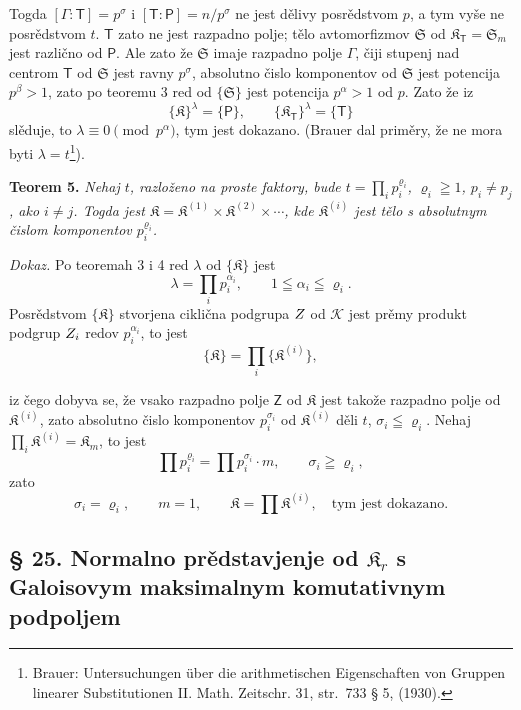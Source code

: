 \documentclass[11pt]{article}
\newcommand{\srcfn}[2]{\footnote{#2}}
\newcommand{\foreign}[1]{#1}
\begin{document}
Togda \([\Gamma:\mathsf{T}]=p^\sigma\) i \([\mathsf{T}:\mathsf P]=n/p^\sigma\) ne jest dělivy posrědstvom \(p\), a tym vyše ne posrědstvom \(t\). \(\mathsf{T}\) zato ne jest razpadno polje; tělo avtomorfizmov \(\mathfrak S\) od \(\mathfrak K_{\mathsf{T}}=\mathfrak S_m\) jest različno od \(\mathsf P\). Ale zato že \(\mathfrak S\) imaje razpadno polje \(\Gamma\), čiji stupenj nad centrom \(\mathsf{T}\) od \(\mathfrak S\) jest ravny \(p^\sigma\), absolutno čislo komponentov od \(\mathfrak S\) jest potencija \(p^\beta>1\), zato po teoremu 3 red od \(\{\mathfrak S\}\) jest potencija \(p^\alpha>1\) od \(p\). Zato že iz
\[
\{\mathfrak K\}^{\lambda}=\{\mathsf P\},
\qquad
\{\mathfrak K_{\mathsf{T}}\}^{\lambda}=\{\mathsf{T}\}
\]
slěduje, to \(\lambda\equiv0\pmod {p^\alpha}\), tym jest dokazano. (Brauer dal priměry, že ne mora byti \(\lambda=t\)\srcfn{1}{\foreign{Brauer: Untersuchungen über die arithmetischen Eigenschaften von Gruppen linearer Substitutionen II. Math. Zeitschr. 31, str.~733 § 5, (1930).}}).

\textbf{Teorem 5.} \emph{Nehaj \(t\), razloženo na proste faktory, bude \(t=\prod_i p_i^{\varrho_i}\), \(\varrho_i\geqq1\), \(p_i\ne p_j\), ako \(i\ne j\). Togda jest \(\mathfrak K=\mathfrak K^{(1)}\times\mathfrak K^{(2)}\times\cdots\), kde \(\mathfrak K^{(i)}\) jest tělo s absolutnym čislom komponentov \(p_i^{\varrho_i}\).}

\emph{Dokaz.} Po teoremah 3 i 4 red \(\lambda\) od \(\{\mathfrak K\}\) jest
\[
\lambda=\prod_i p_i^{\alpha_i},\qquad 1\leqq\alpha_i\leqq\varrho_i.
\]
Posrědstvom \(\{\mathfrak K\}\) stvorjena ciklična podgrupa \(\mathscr \mathsf{Z}\) od \(\mathscr K\) jest prěmy produkt podgrup \(\mathscr \mathsf{Z}_i\) redov \(p_i^{\alpha_i}\), to jest
\[
\{\mathfrak K\}=\prod_i\{\mathfrak K^{(i)}\},
\]

iz čego dobyva se, že vsako razpadno polje \(\mathsf{Z}\) od \(\mathfrak K\) jest takože razpadno polje od \(\mathfrak K^{(i)}\), zato absolutno čislo komponentov \(p_i^{\sigma_i}\) od \(\mathfrak K^{(i)}\) děli \(t\), \(\sigma_i\leqq\varrho_i\). Nehaj \(\prod_i \mathfrak K^{(i)}=\mathfrak K_m\), to jest
\[
\prod p_i^{\varrho_i}=\prod p_i^{\sigma_i}\cdot m,
\qquad
\sigma_i\geqq\varrho_i,
\]
zato
\[
\sigma_i=\varrho_i,\qquad m=1,\qquad
\mathfrak K=\prod \mathfrak K^{(i)},
\quad\text{tym jest dokazano.}
\]

\subsection*{§ 25. Normalno prědstavjenje od \(\mathfrak K_r\) s Galoisovym maksimalnym komutativnym podpoljem\protect\footnotemark}
\label{normaldarstellung-von-r_r-mit-galoisschem-maximalem-kommutativem-teilkoerper-1}
\end{document}
